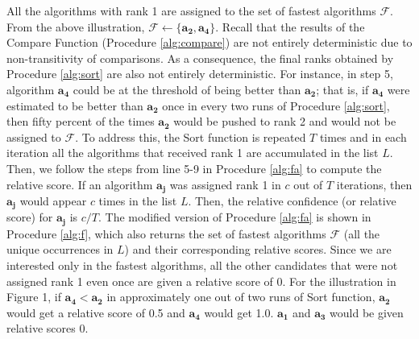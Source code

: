 \documentclass[conference]{IEEEtran}
\begin{document}
All the algorithms with rank 1 are assigned to the set of fastest algorithms $\mathcal{F}$. From the above illustration,
$\mathcal{F} \leftarrow \{\mathbf{a_2}, \mathbf{a_4}\}$. Recall that the results of the Compare Function (Procedure \ref{alg:compare}) are not entirely deterministic due to non-transitivity of comparisons. As a consequence, the final ranks obtained by Procedure \ref{alg:sort} are also not entirely deterministic.
For instance, in step 5, algorithm $\mathbf{a_4}$ could be at the threshold  of being better than $\mathbf{a_2}$;
that is, if $\mathbf{a_4}$ were estimated to be better than $\mathbf{a_2}$ once in every two runs of Procedure \ref{alg:sort}, then fifty percent of the times
$\mathbf{a_2}$ would be pushed to rank 2 and would not be assigned to $\mathcal{F}$. To address this, the Sort function
is repeated
$T$ times and in each iteration all the algorithms that received rank 1 are accumulated in the list $L$. Then, we follow the steps from line 5-9 in Procedure \ref{alg:fa} to compute the relative score. If an
algorithm $\mathbf{a_j}$ was assigned rank 1 in $c$ out of $T$ iterations, then $\mathbf{a_j}$ would appear $c$ times in
the list $L$. Then, the relative confidence (or relative score) for $\mathbf{a_j}$ is $c/T$. 
The modified version of Procedure \ref{alg:fa} is shown in Procedure \ref{alg:f}, which also returns the set of fastest algorithms $\mathcal{F}$ (all the unique occurrences in $L$)
and their corresponding relative scores. Since we are interested only in the fastest algorithms, all the other
candidates that were not assigned rank 1 even once are given a relative score of 0. For the illustration in Figure 1, if $\mathbf{a_4} < \mathbf{a_2}$ in approximately one out of two runs of Sort function, $\mathbf{a_2}$ would get a relative score of 0.5 and $\mathbf{a_4}$ would get 1.0.  $\mathbf{a_1}$ and $\mathbf{a_3}$ would be given relative scores 0.
\end{document}
